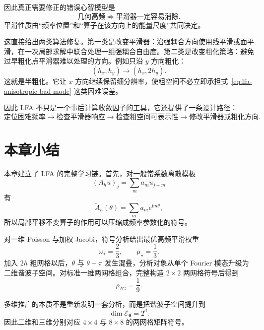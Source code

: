 因此真正需要修正的错误心智模型是
\begin{equation}
\boxed{
\text{几何高频}
\not\Longrightarrow
\text{平滑器一定容易消除}.
}
\end{equation}
平滑性质由“频率位置”和“算子在该方向上的能量尺度”共同决定。

这直接给出两类算法修复。第一类是改变平滑器：沿强耦合方向使用线平滑或面平滑，在一次局部求解中联合处理一组强耦合自由度。第二类是改变粗化策略：避免过早粗化点平滑器难以处理的方向。例如只沿 $y$ 方向粗化：
\begin{equation}
(h_x,h_y)\rightarrow(h_x,2h_y).
\end{equation}
这就是半粗化。它让 $x$ 方向继续保留细分辨率，使粗空间不必立即承担式~\eqref{eq:lfa-anisotropic-bad-mode} 这类困难误差。

因此 LFA 不只是一个事后计算收敛因子的工具，它还提供了一条设计路径：
\begin{equation}
\boxed{
\text{定位困难频率}
\rightarrow
\text{检查平滑器响应}
\rightarrow
\text{检查粗空间可表示性}
\rightarrow
\text{修改平滑器或粗化方向}.
}
\label{eq:lfa-design-loop}
\end{equation}
\section{本章小结}

本章建立了 LFA 的完整学习链。首先，对一般常系数离散模板
\begin{equation}
(A_hu)_j=\sum_m a_mu_{j+m}
\end{equation}
有
\begin{equation}
\widetilde A_h(\theta)
=
\sum_m a_me^{\mathrm im\theta},
\end{equation}
所以局部平移不变算子的作用可以压缩成频率参数化的符号。

对一维 Poisson 与加权 Jacobi，符号分析给出最优高频平滑权重
\begin{equation}
\omega_\star=\frac23,
\qquad
\mu_\star=\frac13.
\end{equation}
加入 $2h$ 粗网格以后，$\theta$ 与 $\theta+\pi$ 发生混叠，分析对象从单个 Fourier 模态升级为二维谐波子空间。对标准一维两网格组合，完整构造 $2\times2$ 两网格符号后得到
\begin{equation}
\boxed{\rho_{TG}=\frac19.}
\end{equation}

多维推广的本质不是重新发明一套分析，而是把谐波子空间提升到
\begin{equation}
\boxed{\dim\mathcal E_{\bm\theta}=2^d.}
\end{equation}
因此二维和三维分别对应 $4\times4$ 与 $8\times8$ 的两网格矩阵符号。

